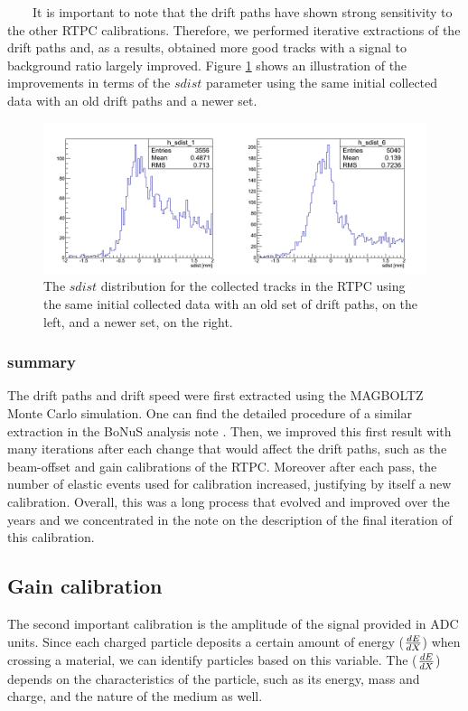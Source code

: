 ~~~~It is important to note that the drift paths have shown strong sensitivity 
to the other RTPC calibrations. Therefore, we performed iterative extractions 
of the drift paths and, as a results, obtained more good tracks with a signal 
to background ratio largely improved. Figure \ref{fig:sdist_comp_pass1v1_v6} 
shows an illustration of the improvements in terms of the $sdist$ parameter 
using the same initial collected data with an old drift paths and a newer set.

\begin{figure}[tp]
\centering
\includegraphics[scale=0.38]{fig_rtpc/sdist_comp_pass1_v1_v6.png}
\caption{The $sdist$ distribution for the collected tracks in the RTPC using 
the same initial collected data with an old set of drift paths, on the left, 
and a newer set, on the right.}
\label{fig:sdist_comp_pass1v1_v6}
\end{figure}

\subsubsection{summary}
The drift paths and drift speed were first extracted using the
MAGBOLTZ Monte Carlo simulation. One can find the detailed procedure of
a similar extraction in the BoNuS analysis note \cite{GEM_holes}.
Then, we improved this first result with many iterations after each change that 
would affect the drift paths, such as the beam-offset and gain calibrations of 
the RTPC. Moreover after each pass, the number of elastic events used for 
calibration increased, justifying by itself a new calibration. Overall, this 
was a long process that evolved and improved over the years and we concentrated 
in the note on the description of the final iteration of this calibration.


\subsection{Gain calibration}
The second important calibration is the amplitude of the signal provided in ADC 
units. Since each charged particle deposits a certain amount of energy 
($\small{\frac{dE}{dX}}$) when crossing a material, we can identify particles 
based on this variable. The ($\small{\frac{dE}{dX}}$) depends on the 
characteristics of the particle, such as its energy, mass and charge, and the 
nature of the medium as well. \\

